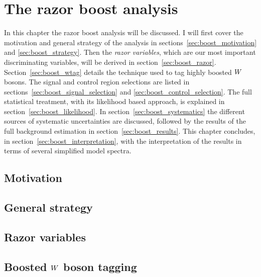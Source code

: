 \chapter{The razor boost analysis \label{chap:razorboost}}

In this chapter the razor boost analysis will be discussed. 
I will first cover the motivation and general strategy of the analysis in 
sections~\ref{sec:boost_motivation} and \ref{sec:boost_strategy}. Then the \textit{razor variables},
which are our most important discriminating variables, will be derived in 
section~\ref{sec:boost_razor}. Section~\ref{sec:boost_wtag} details the technique used to tag highly
boosted $W$ bosons. The signal and control region selections are listed in
sections~\ref{sec:boost_signal_selection} and \ref{sec:boost_control_selection}. 
The full statistical treatment, with its likelihood based approach, is explained in 
section~\ref{sec:boost_likelihood}. In section~\ref{sec:boost_systematics} the different sources of
systematic uncertainties are discussed, followed by the results of the full background estimation in
section~\ref{sec:boost_results}. This chapter concludes, in section~\ref{sec:boost_interpretation},
with the interpretation of the results in terms of several simplified model spectra. 

\section{Motivation \label{sec:boost_motivation}}



\section{General strategy \label{sec:boost_strategy}}



\section{Razor variables \label{sec:boost_razor}}



\section[Boosted W boson tagging]{Boosted $W$ boson tagging \label{sec:boost_wtag}}

